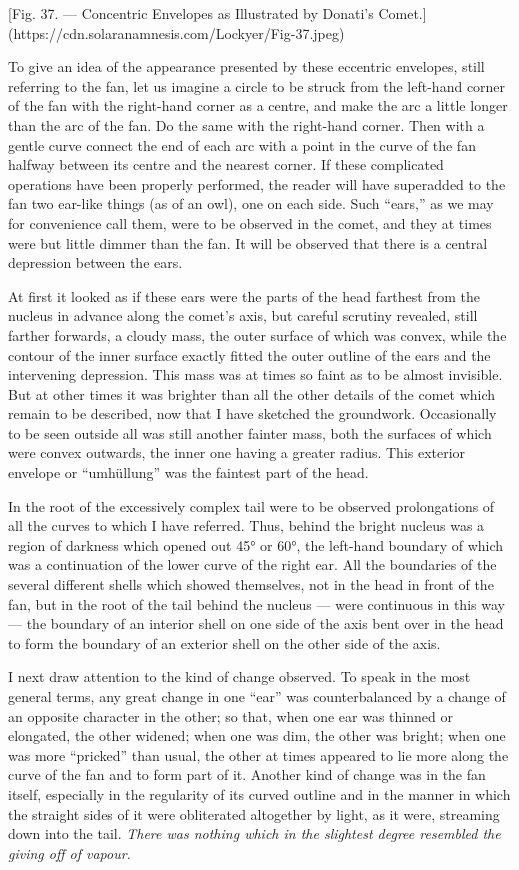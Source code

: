 \documentclass[a4paper, 12pt, oneside, polutonikogreek, english]{article}
\begin{document}
[Fig. 37. --- Concentric Envelopes as Illustrated by Donati's Comet.](https://cdn.solaranamnesis.com/Lockyer/Fig-37.jpeg)

To give an idea of the appearance presented by these eccentric envelopes, still referring to the fan, let us imagine a circle to be struck from the left-hand corner of the fan with the right-hand corner as a centre, and make the arc a little longer than the arc of the fan. Do the same with the right-hand corner. Then with a gentle curve connect the end of each arc with a point in the curve of the fan halfway between its centre and the nearest corner. If these complicated operations have been properly performed, the reader will have superadded to the fan two ear-like things (as of an owl), one on each side. Such ``ears,'' as we may for convenience call them, were to be observed in the comet, and they at times were but little dimmer than the fan. It will be observed that there is a central depression between the ears.

At first it looked as if these ears were the parts of the head farthest from the nucleus in advance along the comet's axis, but careful scrutiny revealed, still farther forwards, a cloudy mass, the outer surface of which was convex, while the contour of the inner surface exactly fitted the outer outline of the ears and the intervening depression. This mass was at times so faint as to be almost invisible. But at other times it was brighter than all the other details of the comet which remain to be described, now that I have sketched the groundwork. Occasionally to be seen outside all was still another fainter mass, both the surfaces of which were convex outwards, the inner one having a greater radius. This exterior envelope or ``umhüllung'' was the faintest part of the head.

In the root of the excessively complex tail were to be observed prolongations of all the curves to which I have referred. Thus, behind the bright nucleus was a region of darkness which opened out 45° or 60°, the left-hand boundary of which was a continuation of the lower curve of the right ear. All the boundaries of the several different shells which showed themselves, not in the head in front of the fan, but in the root of the tail behind the nucleus --- were continuous in this way --- the boundary of an interior shell on one side of the axis bent over in the head to form the boundary of an exterior shell on the other side of the axis.

I next draw attention to the kind of change observed. To speak in the most general terms, any great change in one ``ear'' was counterbalanced by a change of an opposite character in the other; so that, when one ear was thinned or elongated, the other widened; when one was dim, the other was bright; when one was more ``pricked'' than usual, the other at times appeared to lie more along the curve of the fan and to form part of it. Another kind of change was in the fan itself, especially in the regularity of its curved outline and in the manner in which the straight sides of it were obliterated altogether by light, as it were, streaming down into the tail. \emph{There was nothing which in the slightest degree resembled the giving off of vapour.}
\end{document}
